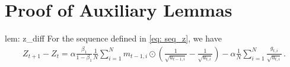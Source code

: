 \documentclass{article} %
\begin{document}




\appendix
\onecolumn

\section{Proof of Auxiliary Lemmas} \label{app: proof_lemmas}
\begin{replemma}{lem: z_diff} For the sequence defined in \eqref{eq: seq_z}, we have
	\begin{align}\label{eq: update_z_proof}
	Z_{t+1} - Z_t = \alpha \frac{\beta_1}{1-\beta_1}  \frac{1}{N} \sum_{i=1}^N m_{t-1	,i} \odot (\frac{1}{\sqrt{u_{t-1,i}}} - \frac{1}{\sqrt{u_{t,i}}}) - \alpha \frac{1}{N} \sum_{i=1}^N \frac{g_{t,i}}{\sqrt{u_{t,i}}} \, .
	\end{align}
\end{replemma}
\end{document}

